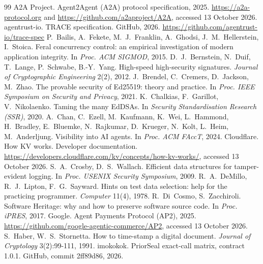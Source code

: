 \documentclass[preprint,12pt,authoryear]{elsarticle}
\begin{document}
\begin{thebibliography}{99}\small
{} A2A Project. Agent2Agent (A2A) protocol specification, 2025. \url{https://a2a-protocol.org} and \url{https://github.com/a2aproject/A2A}, accessed 13 October 2026.
 agentrust-io. TRACE specification. GitHub, 2026. \url{https://github.com/agentrust-io/trace-spec}
 P.~Bailis, A.~Fekete, M.~J.~Franklin, A.~Ghodsi, J.~M.~Hellerstein, I.~Stoica. Feral concurrency control: an empirical investigation of modern application integrity. In \emph{Proc. ACM SIGMOD}, 2015.
 D.~J.~Bernstein, N.~Duif, T.~Lange, P.~Schwabe, B.-Y.~Yang. High-speed high-security signatures. \emph{Journal of Cryptographic Engineering} 2(2), 2012.
 J.~Brendel, C.~Cremers, D.~Jackson, M.~Zhao. The provable security of Ed25519: theory and practice. In \emph{Proc. IEEE Symposium on Security and Privacy}, 2021.
 K.~Chalkias, F.~Garillot, V.~Nikolaenko. Taming the many EdDSAs. In \emph{Security Standardisation Research (SSR)}, 2020.
 A.~Chan, C.~Ezell, M.~Kaufmann, K.~Wei, L.~Hammond, H.~Bradley, E.~Bluemke, N.~Rajkumar, D.~Krueger, N.~Kolt, L.~Heim, M.~Anderljung. Visibility into AI agents. In \emph{Proc. ACM FAccT}, 2024.
 Cloudflare. How KV works. Developer documentation. \url{https://developers.cloudflare.com/kv/concepts/how-kv-works/}, accessed 13 October 2026.
 S.~A.~Crosby, D.~S.~Wallach. Efficient data structures for tamper-evident logging. In \emph{Proc. USENIX Security Symposium}, 2009.
 R.~A.~DeMillo, R.~J.~Lipton, F.~G.~Sayward. Hints on test data selection: help for the practicing programmer. \emph{Computer} 11(4), 1978.
 R.~Di~Cosmo, S.~Zacchiroli. Software Heritage: why and how to preserve software source code. In \emph{Proc. iPRES}, 2017.
 Google. Agent Payments Protocol (AP2), 2025. \url{https://github.com/google-agentic-commerce/AP2}, accessed 13 October 2026.
 S.~Haber, W.~S.~Stornetta. How to time-stamp a digital document. \emph{Journal of Cryptology} 3(2):99-111, 1991.
 imokokok. PriorSeal exact-call matrix, contract 1.0.1. GitHub, commit 2ff89d86, 2026.

\end{thebibliography}
\end{document}
